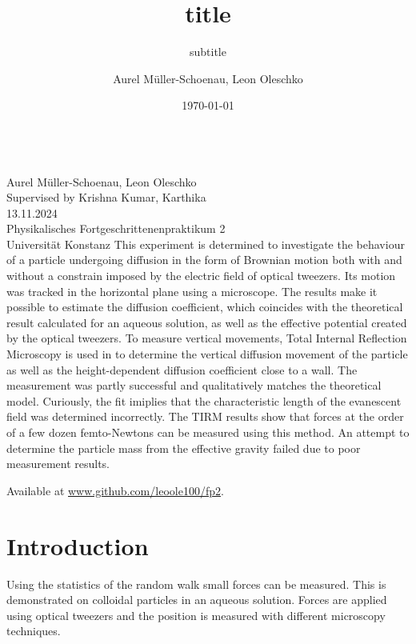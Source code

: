 \documentclass[
    twoside=false,
    twocolumn=true,
    fontsize=11pt,
]{scrarticle}
\begin{document}
\title{title}
\subtitle{subtitle}
\author{Aurel Müller-Schoenau, Leon Oleschko}
\date{\dotdate\today}


\begin{titlepage}
    \sffamily
    \vspace*{3cm}
    {
        \fontsize{32}{32}
    }
    \vspace{.25cm}\\
    {
        \Large
        Aurel Müller-Schoenau, Leon Oleschko\\
        Supervised by Krishna Kumar, Karthika
        \vspace{.05cm}\\
        13.11.2024
        \vspace{.25cm}\\
        \normalsize
        Physikalisches Fortgeschrittenenpraktikum 2\\
        Universität Konstanz
    }
    \vfill
    {
        \normalfont\normalsize
        This experiment is determined to investigate the behaviour of a particle undergoing diffusion in the form of Brownian motion both with and without a constrain imposed by the electric field of optical tweezers. Its motion was tracked in the horizontal plane using a microscope. The results make it possible to estimate the diffusion coefficient, which coincides with the theoretical result calculated for an aqueous solution, as well as the effective potential created by the optical tweezers. To measure vertical movements, Total Internal Reflection Microscopy is used in to determine the vertical diffusion movement of the particle as well as the height-dependent diffusion coefficient close to a wall. The measurement was partly successful and qualitatively matches the theoretical model. Curiously, the fit imiplies that the characteristic length of the evanescent field was determined incorrectly. The TIRM results show that forces at the order of a few dozen femto-Newtons can be measured using this method. An attempt to determine the particle mass from the effective gravity failed due to poor measurement results.
    }
    \vfill
    \begin{flushright}
        Available at \url{www.github.com/leoole100/fp2}.
    \end{flushright}
\end{titlepage}

\section{Introduction}
Using the statistics of the random walk small forces can be measured.
This is demonstrated on colloidal particles in an aqueous solution.
Forces are applied using optical tweezers and the position is measured with different microscopy techniques.
\end{document}
